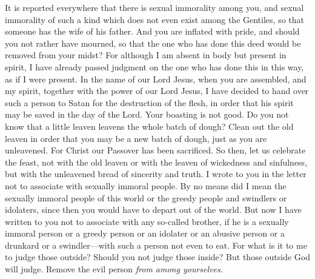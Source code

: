 \begin{biblechapter} %
 It is reported everywhere that there is sexual immorality among you, and sexual immorality of such a kind which does not even exist among the Gentiles, so that someone has the wife of his father.
\verse And you are inflated with pride, and should you not rather have mourned, so that the one who has done this deed would be removed from your midst?
\verse For although I am absent in body but present in spirit, I have already passed judgment on the one who has done this in this way, as if I were present.
\verse In the name of our Lord Jesus, when you are assembled, and my spirit, together with the power of our Lord Jesus,
\verse I have decided to hand over such a person to Satan for the destruction of the flesh, in order that his spirit may be saved in the day of the Lord.
\verse Your boasting is not good. Do you not know that a little leaven leavens the whole batch of dough?
\verse Clean out the old leaven in order that you may be a new batch of dough, just as you are unleavened. For Christ our Passover has been sacrificed.
\verse So then, let us celebrate the feast, not with the old leaven or with the leaven of wickedness and sinfulness, but with the unleavened bread of sincerity and truth.
\verse I wrote to you in the letter not to associate with sexually immoral people.
\verse By no means did I mean the sexually immoral people of this world or the greedy people and swindlers or idolaters, since then you would have to depart out of the world.
\verse But now I have written to you not to associate with any so-called brother, if he is a sexually immoral person or a greedy person or an idolater or an abusive person or a drunkard or a swindler—with such a person not even to eat.
\verse For what is it to me to judge those outside? Should you not judge those inside?
\verse But those outside God will judge. Remove the evil person \textit{from among yourselves}.
\end{biblechapter}

